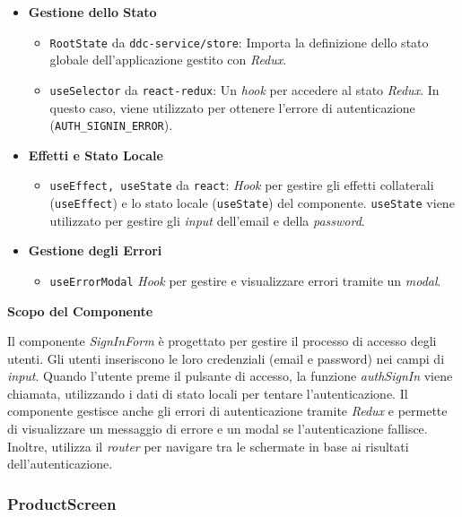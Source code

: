 \begin{itemize}
    \item \textbf{Gestione dello Stato}
    \begin{itemize}
        \item \texttt{RootState} da \texttt{ddc-service/store}: Importa la definizione dello stato globale dell'applicazione gestito con \textit{Redux}.
        \item \texttt{useSelector} da \texttt{react-redux}: Un \textit{hook} per accedere al stato \textit{Redux}. In questo caso, viene utilizzato per ottenere l'errore di autenticazione (\texttt{AUTH\_SIGNIN\_ERROR}).
    \end{itemize}
    
    \item \textbf{Effetti e Stato Locale}
    \begin{itemize}
        \item \texttt{useEffect, useState} da \texttt{react}: \textit{Hook} per gestire gli effetti collaterali (\texttt{useEffect}) e lo stato locale (\texttt{useState}) del componente. \texttt{useState} viene utilizzato per gestire gli \textit{input} dell'email e della \textit{password}.
    \end{itemize}
    
    \item \textbf{Gestione degli Errori}
    \begin{itemize}
        \item \texttt{useErrorModal} \textit{Hook} per gestire e visualizzare errori tramite un \textit{modal}.
    \end{itemize}
\end{itemize}

\textbf{Scopo del Componente}

Il componente \textit{SignInForm} è progettato per gestire il processo di accesso degli utenti.
Gli utenti inseriscono le loro credenziali (email e password) nei campi di \textit{input}.
Quando l'utente preme il pulsante di accesso, la funzione \textit{authSignIn} viene chiamata, utilizzando i dati di stato locali per tentare l'autenticazione.
Il componente gestisce anche gli errori di autenticazione tramite \textit{Redux} e permette di visualizzare un messaggio di errore e un modal se l'autenticazione fallisce.
Inoltre, utilizza il \textit{router} per navigare tra le schermate in base ai risultati dell'autenticazione.


\subsubsection{ProductScreen}

